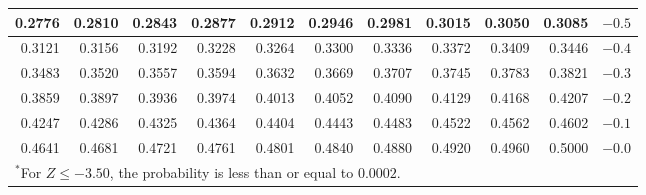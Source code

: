 \begin{table}[H]
\begin{center}
{\begin{tabular}{| rrrrr | rrrrr | c}
  \normalsize{0.2776} & \normalsize{0.2810} & \normalsize{0.2843} & \normalsize{0.2877} & \normalsize{0.2912} & \normalsize{0.2946} & \normalsize{0.2981} & \normalsize{0.3015} & \normalsize{0.3050} & \normalsize{0.3085} & $-0.5$ \\
    \hline
  \normalsize{0.3121} & \normalsize{0.3156} & \normalsize{0.3192} & \normalsize{0.3228} & \normalsize{0.3264} & \normalsize{0.3300} & \normalsize{0.3336} & \normalsize{0.3372} & \normalsize{0.3409} & \normalsize{0.3446} & $-0.4$ \\
  \normalsize{0.3483} & \normalsize{0.3520} & \normalsize{0.3557} & \normalsize{0.3594} & \normalsize{0.3632} & \normalsize{0.3669} & \normalsize{0.3707} & \normalsize{0.3745} & \normalsize{0.3783} & \normalsize{0.3821} & $-0.3$ \\
  \normalsize{0.3859} & \normalsize{0.3897} & \normalsize{0.3936} & \normalsize{0.3974} & \normalsize{0.4013} & \normalsize{0.4052} & \normalsize{0.4090} & \normalsize{0.4129} & \normalsize{0.4168} & \normalsize{0.4207} & $-0.2$ \\
  \normalsize{0.4247} & \normalsize{0.4286} & \normalsize{0.4325} & \normalsize{0.4364} & \normalsize{0.4404} & \normalsize{0.4443} & \normalsize{0.4483} & \normalsize{0.4522} & \normalsize{0.4562} & \normalsize{0.4602} & $-0.1$ \\
  \normalsize{0.4641} & \normalsize{0.4681} & \normalsize{0.4721} & \normalsize{0.4761} & \normalsize{0.4801} & \normalsize{0.4840} & \normalsize{0.4880} & \normalsize{0.4920} & \normalsize{0.4960} & \normalsize{0.5000} & $-0.0$ \\
    \hline
\multicolumn{11}{l}{{\normalsize$^*$For $Z \leq -3.50$, the probability is less than or equal to $0.0002$.}}
\end{tabular}}
\end{center}
\end{table}

\pagebreak
\thispagestyle{empty}


